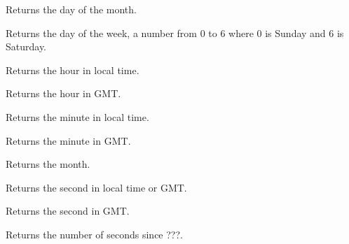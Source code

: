 \label{wxtimegetday}


Returns the day of the month.

\label{wxtimegetdatofweek}


Returns the day of the week, a number from 0 to 6 where 0 is Sunday and 6 is Saturday.

\label{wxtimegethour}


Returns the hour in local time.

\label{wxtimegethourgmt}


Returns the hour in GMT.

\label{wxtimegetminute}


Returns the minute in local time.

\label{wxtimegetminutegmt}


Returns the minute in GMT.

\label{wxtimegetmonth}


Returns the month.

\label{wxtimegetsecond}


Returns the second in local time or GMT.

\label{wxtimegetsecondgmt}


Returns the second in GMT.

\label{wxtimegetseconds}


Returns the number of seconds since ???.

\label{wxtimegetyear}

